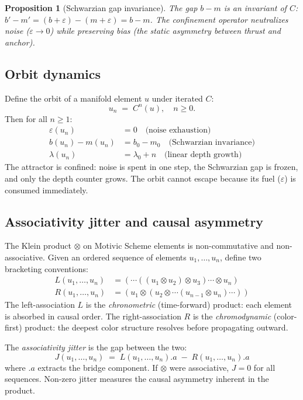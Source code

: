 \documentclass[12pt,oneside]{article}
\theoremstyle{principia}
\newtheorem{proposition}[theorem]{Proposition}
\theoremstyle{definition}
\theoremstyle{remark}
\begin{document}
\begin{proposition}[Schwarzian gap invariance]
\label{prop:schwarzian}
The gap $b - m$ is an invariant of $C$:
$b' - m' = (b + \varepsilon) - (m + \varepsilon) = b - m$.
The confinement operator neutralizes \emph{noise}
($\varepsilon \to 0$) while preserving \emph{bias}
(the static asymmetry between thrust and anchor).
\end{proposition}

\subsection{Orbit dynamics}

Define the orbit of a manifold element $u$ under iterated $C$:
\[
u_n \;=\; C^n(u), \quad n \geq 0.
\]
Then for all $n \geq 1$:
\begin{align}
\varepsilon(u_n) &= 0 \quad \text{(noise exhaustion)} \\
b(u_n) - m(u_n) &= b_0 - m_0 \quad \text{(Schwarzian invariance)} \\
\lambda(u_n) &= \lambda_0 + n \quad \text{(linear depth growth)}
\end{align}
The attractor is confined: noise is spent in one step,
the Schwarzian gap is frozen, and only the depth counter
grows. The orbit cannot escape because its fuel ($\varepsilon$)
is consumed immediately.

\subsection{Associativity jitter and causal asymmetry}

The Klein product $\otimes$ on Motivic Scheme elements is
non-commutative and non-associative. Given an ordered sequence
of elements $u_1, \ldots, u_n$, define two bracketing conventions:
\begin{align}
L(u_1, \ldots, u_n) &= (\cdots((u_1 \otimes u_2) \otimes u_3) \cdots \otimes u_n) \\
R(u_1, \ldots, u_n) &= (u_1 \otimes (u_2 \otimes \cdots (u_{n-1} \otimes u_n) \cdots))
\end{align}
The left-association $L$ is the \emph{chronometric} (time-forward)
product: each element is absorbed in causal order. The
right-association $R$ is the \emph{chromodynamic} (color-first)
product: the deepest color structure resolves before propagating
outward.

The \emph{associativity jitter} is the gap between the two:
\[
J(u_1, \ldots, u_n) \;=\; L(u_1, \ldots, u_n).a \;-\; R(u_1, \ldots, u_n).a
\]
where $.a$ extracts the bridge component. If $\otimes$ were
associative, $J = 0$ for all sequences. Non-zero jitter
measures the causal asymmetry inherent in the product.
\end{document}
